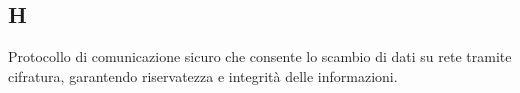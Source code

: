 \begin{center}
\section*{H}
\end{center}

Protocollo di comunicazione sicuro che consente lo scambio di dati su rete tramite cifratura, garantendo riservatezza e integrità delle informazioni.

